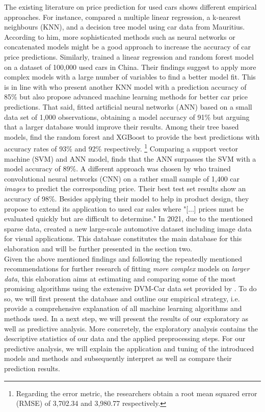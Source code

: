 \documentclass[12pt]{article}
\begin{document}
\noindent The existing literature on price prediction for used cars shows different empirical approaches. For instance, \cite{Pudaruth2014} compared a multiple linear regression, a k-nearest neighbours (KNN), and a decision tree model using car data from Mauritius. According to him, more sophisticated methods such as neural networks or concatenated models might be a good approach to increase the accuracy of car price predictions. Similarly, \cite{chen2017comparative} trained a linear regression and random forest model on a dataset of 100,000 used cars in China. Their findings suggest to apply more complex models with a large number of variables to find a better model fit. This is in line with \cite{Samruddhi2020} who present another KNN model with a prediction accuracy of 85\% but also propose advanced machine learning methods for better car price predictions. That said, \cite{Karakoç2020} fitted artificial neural networks (ANN) based on a small data set of 1,000 observations, obtaining a model accuracy of 91\% but arguing that a larger database would improve their results. Among their tree based models, \cite{Gajera2021} find the random forest and XGBoost to provide the best predictions with accuracy rates of 93\% and 92\% respectively. \footnote{Regarding the error metric, the researchers obtain a root mean squared error (RMSE) of 3,702.34 and 3,980.77 respectively.} Comparing a support vector machine (SVM) and ANN model, \cite{Bilen2021} finds that the ANN surpasses the SVM with a model accuracy of 89\%. A different approach was chosen by \cite{yang2018ai} who trained convolutional neural networks (CNN) on a rather small sample of 1,400 car \textit{images} to predict the corresponding price. Their best test set results show an accuracy of 98\%. Besides applying their model to help in product design, they propose to extend its application to used car sales where "[...] prices must be evaluated quickly but are difficult to determine." In 2021, due to the mentioned sparse data, \cite{huang2023dvmcar} created a new large-scale automotive dataset including image data for visual applications. This database constitutes the main database for this elaboration and will be further presented in the section two. \\

\noindent Given the above mentioned findings and following the repeatedly mentioned recommendations for further research of fitting \textit{more complex} models on \textit{larger data}, this elaboration aims at estimating and comparing some of the most promising algorithms using the extensive DVM-Car data set provided by \cite{huang2023dvmcar}. To do so, we will first present the database and outline our empirical strategy, i.e. provide a comprehensive explanation of all machine learning algorithms and methods used. In a next step, we will present the results of our exploratory as well as predictive analysis. More concretely, the exploratory analysis contains the descriptive statistics of our data and the applied preprocessing steps. For our predictive analysis, we will explain the application and tuning of the introduced models and methods and subsequently interpret as well as compare their prediction results. \\
\end{document}
